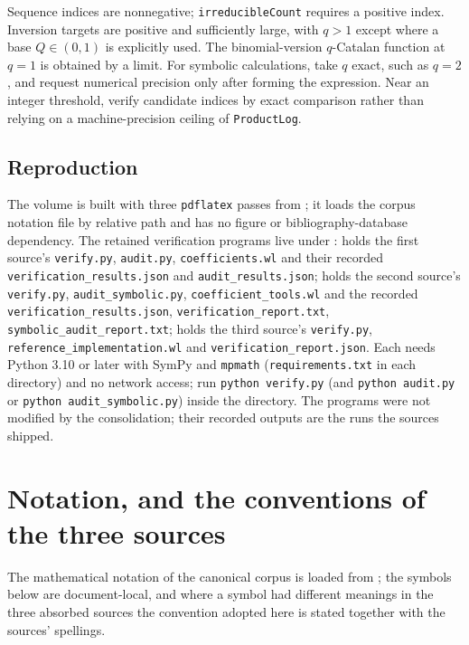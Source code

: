 \documentclass[11pt,openany]{book}
\numberwithin{equation}{chapter}
\theoremstyle{plain}
\theoremstyle{definition}
\theoremstyle{remark}
\begin{document}
Sequence indices are nonnegative; \texttt{irreducibleCount} requires a positive index. Inversion targets are positive and sufficiently large, with $q>1$ except where a base $Q\in(0,1)$ is explicitly used. The binomial-version $q$-Catalan function at $q=1$ is obtained by a limit. For symbolic calculations, take $q$ exact, such as $q=2$, and request numerical precision only after forming the expression. Near an integer threshold, verify candidate indices by exact comparison rather than relying on a machine-precision ceiling of \texttt{ProductLog}.

\section{Reproduction}
\label{ct:app:reproduce}

The volume is built with three \texttt{pdflatex} passes from
; it loads the corpus
notation file  by relative path and has no
figure or bibliography-database dependency.  The retained verification
programs live under :  holds the first
source's \texttt{verify.py}, \texttt{audit.py}, \texttt{coefficients.wl} and
their recorded \texttt{verification\_results.json} and
\texttt{audit\_results.json};  holds the second source's
\texttt{verify.py}, \texttt{audit\_symbolic.py}, \texttt{coefficient\_tools.wl}
and the recorded \texttt{verification\_results.json},
\texttt{verification\_report.txt}, \texttt{symbolic\_audit\_report.txt};
 holds the third source's \texttt{verify.py},
\texttt{reference\_implementation.wl} and \texttt{verification\_report.json}.
Each needs Python 3.10 or later with SymPy and \texttt{mpmath}
(\texttt{requirements.txt} in each directory) and no network access; run
\texttt{python verify.py} (and \texttt{python audit.py} or
\texttt{python audit\_symbolic.py}) inside the directory.  The programs were
not modified by the consolidation; their recorded outputs are the runs the
sources shipped.


\chapter{Notation, and the conventions of the three sources}
\label{ct:app:notation}

The mathematical notation of the canonical corpus is loaded from
; the symbols below are document-local, and
where a symbol had different meanings in the three absorbed sources the
convention adopted here is stated together with the sources' spellings.
\end{document}
